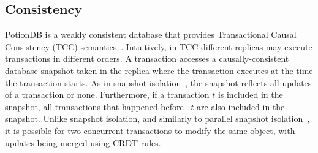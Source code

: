 \documentclass[sigplan,review,anonymous]{acmart}
\begin{document}



\subsection{Consistency}
\label{sec:consistency}

PotionDB is a weakly consistent database that provides Transactional Causal Consistency (TCC) 
semantics~\cite{cure,Wu20Transactional,walter}.
Intuitively, in TCC different replicas may execute transactions in different orders.
A transaction accesses a causally-consistent database snapshot taken in the replica where the transaction executes
at the time the transaction starts. 
As in snapshot isolation~\cite{Berenson95Critique},  the snapshot reflects all updates of a transaction or none.   
Furthermore, if a transaction $t$ is included in the snapshot, all transactions that 
happened-before~\cite{lamport78}  $t$ are also included in the snapshot.
Unlike snapshot isolation, and similarly to parallel snapshot isolation~\cite{walter}, it is
possible for two concurrent transactions to modify the same object, with updates
being merged using CRDT rules.
\end{document}
